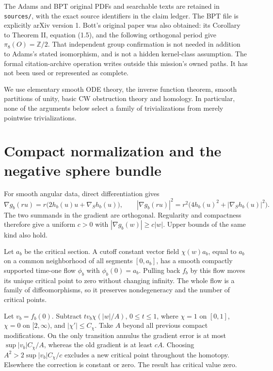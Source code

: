 \documentclass[11pt]{article}
\newcommand{\Z}{\mathbb Z}
\begin{document}
The Adams and BPT original PDFs and searchable texts are retained in
\texttt{sources/}, with the exact source identifiers in the claim ledger.
The BPT file is explicitly arXiv version 1.
Bott's original paper was also obtained: its Corollary to Theorem II,
equation (1.5), and the following orthogonal period give
\(\pi_8(O)=\Z/2\). That independent group confirmation is not needed
in addition to Adams's stated isomorphism, and is not a hidden
kernel-class assumption.
The formal citation-archive operation writes outside this mission's
owned paths. It has not been used or represented as complete.

We use elementary smooth ODE theory, the inverse function theorem,
smooth partitions of unity, basic CW obstruction theory and homology.
In particular, none of the arguments below select a family of
trivializations from merely pointwise trivializations.

\section{Compact normalization and the negative sphere bundle}

For smooth angular data, direct differentiation gives
\[
 \nabla g_b(ru)=r\bigl(2h_b(u)u+\nabla_Sh_b(u)\bigr),\qquad
 |\nabla g_b(ru)|^2
 =r^2\bigl(4h_b(u)^2+|\nabla_Sh_b(u)|^2\bigr).
 \tag{1}
\]
The two summands in the gradient are orthogonal. Regularity and
compactness therefore give a uniform \(c>0\) with
\(|\nabla g_b(w)|\geq c|w|\). Upper bounds of the same kind also hold.

Let \(a_b\) be the critical section. A cutoff constant vector field
\(\chi(w)a_b\), equal to \(a_b\) on a common neighborhood of all segments
\([0,a_b]\), has a smooth compactly supported time-one flow \(\phi_b\)
with \(\phi_b(0)=a_b\). Pulling back \(f_b\) by this flow moves its
unique critical point to zero without changing infinity.
The whole flow is a family of diffeomorphisms, so it preserves
nondegeneracy and the number of critical points.

Let \(v_b=f_b(0)\). Subtract
\(t v_b\chi(|w|/A)\), \(0\leq t\leq1\), where \(\chi=1\) on
\([0,1]\), \(\chi=0\) on \([2,\infty)\), and \(|\chi'|\leq C_\chi\).
Take \(A\) beyond all previous compact modifications.
On the only transition annulus the gradient error is at most
\(\sup|v_b|C_\chi/A\), whereas the old gradient is at least \(cA\).
Choosing \(A^2>2\sup|v_b|C_\chi/c\) excludes a new critical point
throughout the homotopy. Elsewhere the correction is constant or zero.
The result has critical value zero.
\end{document}
